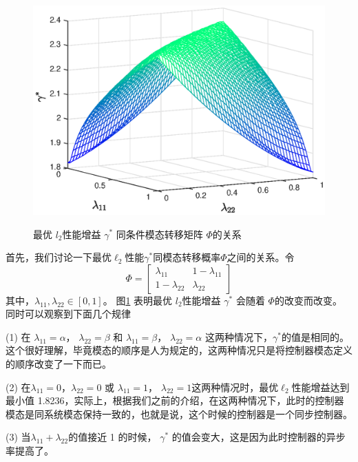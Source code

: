 \begin{figure}[!htb] 
	\centering\includegraphics[scale=0.6]{./figures/lure_system/3d3.eps}\\ 
	\caption{最优 $l_2$性能增益 $\gamma^{*}$ 同条件模态转移矩阵 $\varPhi$的关系}
	\label{fig1}
\end{figure}

首先，我们讨论一下最优$\ell_2$性能$\gamma^{*}$同模态转移概率$\varPhi$之间的关系。令
\begin{equation*}
\varPhi=\begin{bmatrix}
\lambda_{11}&1-\lambda_{11} \\
1-\lambda_{22}&\lambda_{22}
\end{bmatrix}
\end{equation*}
其中，$\lambda_{11},\lambda_{22} \in [0,1]$。 图\ref{fig1} 表明最优 $l_2$性能增益 $\gamma^{*}$ 会随着 $\varPhi$的改变而改变。 同时可以观察到下面几个规律

	(1) 在 $\lambda_{11}=\alpha$， $\lambda_{22}=\beta$ 和 $\lambda_{11}=\beta$， $\lambda_{22}=\alpha$ 这两种情况下，$\gamma^{*}$的值是相同的。这个很好理解，毕竟模态的顺序是人为规定的，这两种情况只是将控制器模态定义的顺序改变了一下而已。
	
	(2) 在$\lambda_{11}=0$，$\lambda_{22}=0$ 或 $\lambda_{11}=1$， $\lambda_{22}=1$这两种情况时，最优$\ell_2$性能增益达到最小值 1.8236，实际上，根据我们之前的介绍，在这两种情况下，此时的控制器模态是同系统模态保持一致的，也就是说，这个时候的控制器是一个同步控制器。
	
	(3) 当$\lambda_{11}+\lambda_{22}$的值接近 1 的时候，	$\gamma^{*}$ 的值会变大，这是因为此时控制器的异步率提高了。


